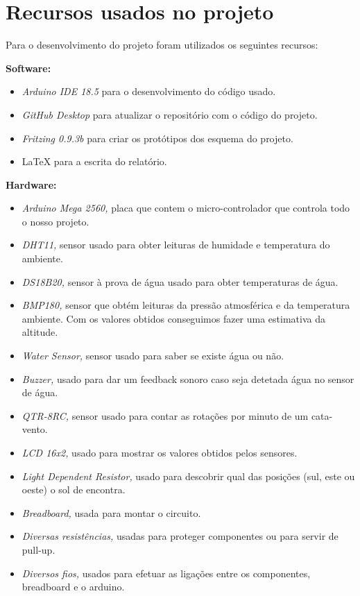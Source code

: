 \documentclass[11pt]{report}
\begin{document}
\chapter*{Recursos usados no projeto}

Para o desenvolvimento do projeto foram utilizados os seguintes recursos:

\textbf{Software:}
\begin{itemize}
\item \textit{Arduino IDE 18.5} para o desenvolvimento do código usado.
\item \textit{GitHub Desktop} para atualizar o repositório com o código do projeto.
\item \textit{Fritzing 0.9.3b} para criar os protótipos dos esquema do projeto.
\item \LaTeX \hspace{1mm} para a escrita do relatório.

\end{itemize}

\textbf{Hardware:}
\begin{itemize}
\item \textit{Arduino Mega 2560,} placa que contem o micro-controlador que controla todo o nosso projeto.
\item \textit{DHT11,} sensor usado para obter leituras de humidade e temperatura do ambiente.
\item \textit{DS18B20,} sensor à prova de água usado para obter temperaturas de água.
\item \textit{BMP180,} sensor que obtém leituras da pressão atmosférica e da temperatura ambiente. Com os valores obtidos conseguimos fazer uma estimativa da altitude.
\item \textit{Water Sensor,} sensor usado para saber se existe água ou não.
\item \textit{Buzzer,} usado para dar um feedback sonoro caso seja detetada água no sensor de água.
\item \textit{QTR-8RC,} sensor usado para contar as rotações por minuto de um cata-vento.
\item \textit{LCD 16x2,} usado para mostrar os valores obtidos pelos sensores.
\item \textit{Light Dependent Resistor,} usado para descobrir qual das posições (sul, este ou oeste) o sol de encontra.
\item \textit{Breadboard,} usada para montar o circuito.
\item \textit{Diversas resistências,} usadas para proteger componentes ou para servir de pull-up.
\item \textit{Diversos fios,} usados para efetuar as ligações entre os componentes, breadboard e o arduino.

\end{itemize}
\end{document}
